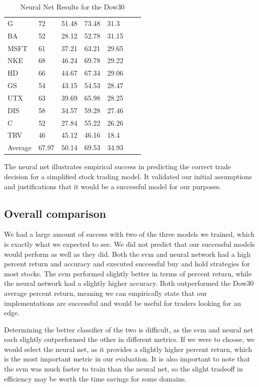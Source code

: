 \documentclass{article}
\begin{document}
\begin{table}[h]
\begin{tabular}{@{}lllllll@{}}
    G & 72 & 51.48 & 73.48 & 31.3 & \\
    BA & 52 & 28.12 & 52.78 & 31.15 & \\
    MSFT & 61 & 37.21 & 63.21 & 29.65 & \\
    NKE & 68 & 46.24 & 69.78 & 29.22 & \\
    HD & 66 & 44.67 & 67.34 & 29.06 & \\
    GS & 54 & 43.15 & 54.53 & 28.47 & \\
    UTX & 63 & 39.69 & 65.98 & 28.25 & \\
    DIS & 58 & 34.57 & 59.28 & 27.46 & \\
    C & 52 & 27.84 & 55.22 & 26.26 & \\
    TRV & 46 & 45.12 & 46.16 & 18.4 & \\ \bottomrule
    Average & 67.97 & 50.14 & 69.53 & 34.93 & \\
  \end{tabular}
  \caption{Neural Net Results for the Dow30}
  \label{my-label}
\end{table}

The neural net illustrates empirical success in predicting the correct trade decision for a simplified stock trading model. It validated our initial assumptions and justifications that it would be a successful model for our purposes.

\subsection{Overall comparison}
We had a large amount of success with two of the three models we trained, which is exactly what we expected to see. We did not predict that our successful models would perform as well as they did. Both the svm and neural network had a high percent return and accuracy and executed successful buy and hold strategies for most stocks. The svm performed slightly better in terms of percent return, while the neural network had a slightly higher accuracy. Both outperformed the Dow30 average percent return, meaning we can empirically state that our implementations are successful and would be useful for traders looking for an edge.

Determining the better classifier of the two is difficult, as the svm and neural net each slightly outperformed the other in different metrics. If we were to choose, we would select the neural net, as it provides a slightly higher percent return, which is the most important metric in our evaluation. It is also important to note that the svm was much faster to train than the neural net, so the slight tradeoff in efficiency may be worth the time savings for some domains.
\end{document}
